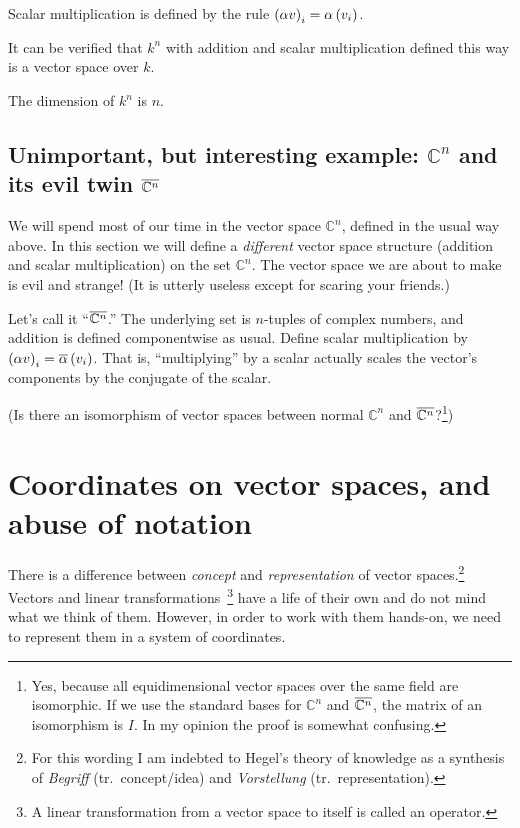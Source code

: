 Scalar multiplication is defined by the rule \(\del{\alpha v}_i = \alpha \del{v_i} \).

It can be verified that \(k^n\) with addition and scalar multiplication defined this way is a vector space over \(k\).

\begin{theorem}
  The dimension of \(k^n\) is \(n\).
\end{theorem}

\subsection{Unimportant, but interesting example: \(\mathbb{C}^n\) and its evil twin \(\overline{\mathbb{C}^n}\)}
We will spend most of our time in the vector space \(\mathbb{C}^n\), defined in the usual way above.
In this section we will define a \emph{different} vector space structure (addition and scalar multiplication) on the set \(\mathbb{C}^n\).
The vector space we are about to make is evil and strange!
(It is utterly useless except for scaring your friends.)

Let's call it ``\(\overline{\mathbb{C}^n}\).''
The underlying set is \(n\)-tuples of complex numbers, and addition is defined componentwise as usual.
Define scalar multiplication by \(\del{\alpha v}_i = \conj{\alpha} \del{v_i}\).
That is, ``multiplying'' by a scalar actually scales the vector's components by the conjugate of the scalar.

(Is there an isomorphism of vector spaces between normal \(\mathbb{C}^n\) and \(\overline{\mathbb{C}^n}\)?\footnote{Yes, because all equidimensional vector spaces over the same field are isomorphic. If we use the standard bases for \(\mathbb{C}^n\) and \(\overline{\mathbb{C}^n}\), the matrix of an isomorphism is \(I\). In my opinion the proof is somewhat confusing.})

\section{Coordinates on vector spaces, and abuse of notation}
There is a difference between \emph{concept} and \emph{representation} of vector spaces.\footnote{For this wording I am indebted to Hegel's theory of knowledge as a synthesis of \emph{Begriff} (tr.~concept/idea) and \emph{Vorstellung} (tr.~representation).}
Vectors and linear transformations\
\footnote{A linear transformation from a vector space to itself is called an operator.} have a life of their own and do not mind what we think of them.
However, in order to work with them hands-on, we need to represent them in a system of coordinates.

